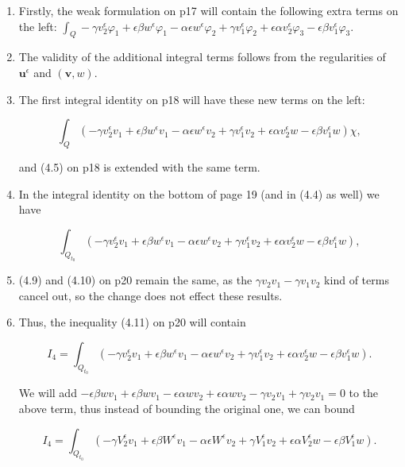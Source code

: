\documentclass[11pt]{article}
\begin{document}
\begin{enumerate}

  \item Firstly, the weak formulation on p17 will contain the following extra terms on the left: $ \int_Q  - \gamma v_2^\epsilon \varphi_1 + \epsilon \beta w^\epsilon \varphi_1 - \alpha \epsilon w^\epsilon \varphi_2 + \gamma v_1^\epsilon \varphi_2 + \epsilon \alpha v^\epsilon_2 \varphi_3 - \epsilon \beta v^\epsilon_1 \varphi_3.$
  
  \item The validity of the additional integral terms follows from the regularities of $\mathbf{u}^\epsilon$ and $(\mathbf{v},w).$
  
  \item The first integral identity on p18 will have these new terms on the left:
  
    $$ \int_Q  ( - \gamma v_2^\epsilon v_1 + \epsilon \beta w^\epsilon v_1 - \alpha \epsilon w^\epsilon v_2 + \gamma v_1^\epsilon v_2 + \epsilon \alpha v^\epsilon_2 w - \epsilon \beta v^\epsilon_1 w) \chi ,$$
    
    and (4.5) on p18 is extended with the same term.
    
  \item In the integral identity on the bottom of page 19 (and in (4.4) as well) we have
  
   $$ \int_{Q_{t_0}}  ( - \gamma v_2^\epsilon v_1 + \epsilon \beta w^\epsilon v_1 - \alpha \epsilon w^\epsilon v_2 + \gamma v_1^\epsilon v_2 + \epsilon \alpha v^\epsilon_2 w - \epsilon \beta v^\epsilon_1 w) ,$$

  \item (4.9) and (4.10) on p20 remain the same, as the $\gamma v_2 v_1 - \gamma v_1 v_2$ kind of terms cancel out, so the change does not effect these results.
  
  \item Thus, the inequality (4.11) on p20 will contain
  
    $$ I_4 = \int_{Q_{t_0}}  ( - \gamma v_2^\epsilon v_1 + \epsilon \beta w^\epsilon v_1 - \alpha \epsilon w^\epsilon v_2 + \gamma v_1^\epsilon v_2 + \epsilon \alpha v^\epsilon_2 w - \epsilon \beta v^\epsilon_1 w).$$
    
    We will add $ - \epsilon \beta w v_1 +  \epsilon \beta w v_1 - \epsilon \alpha w v_2 + \epsilon \alpha w v_2 - \gamma v_2 v_1 + \gamma v_2 v_1 = 0 $ to the above term, thus instead of bounding the original one, we can bound

    $$ I_4 = \int_{Q_{t_0}}  ( - \gamma V_2^\epsilon v_1 + \epsilon \beta W^\epsilon v_1 - \alpha \epsilon W^\epsilon v_2 + \gamma V_1^\epsilon v_2 + \epsilon \alpha V^\epsilon_2 w - \epsilon \beta V^\epsilon_1 w).$$
    

\end{enumerate}
\end{document}
